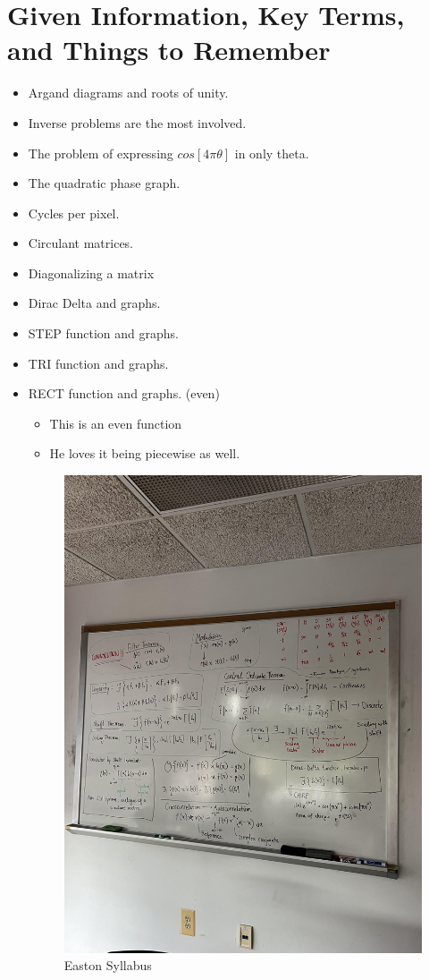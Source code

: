 \documentclass{article}
\begin{document}
\section{Given Information, Key Terms, and Things to Remember} 
\begin{itemize}
\item Argand diagrams and roots of unity.
\item Inverse problems are the most involved. 
\item The problem of expressing $cos [4 \pi \theta ]$ in only theta. 
\item The quadratic phase graph.
\item Cycles per pixel. 
\item Circulant matrices.
\item Diagonalizing a matrix
\item Dirac Delta and graphs. 
\item STEP function and graphs. 
\item TRI function and graphs. 
\item RECT function and graphs. (even) 
  \begin{itemize}
    \item This is an even function
    \item He loves it being piecewise as well.
  \end{itemize}

\begin{figure}[h!]
\centering
\includegraphics[scale=.20]{Fourier/unnamed.jpg}
\caption{Easton Syllabus}
\label{fig:Snowmanda}
\end{figure}



\end{itemize}
\end{document}
